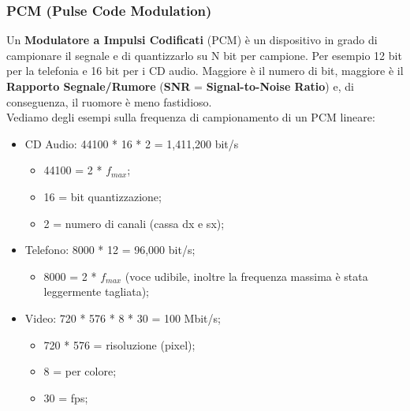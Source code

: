 \documentclass{article}
\begin{document}
			\subsubsection{PCM (Pulse Code Modulation)}
				Un \textbf{Modulatore a Impulsi Codificati} (PCM) è un dispositivo in grado di campionare il segnale e di quantizzarlo su N bit per campione. Per esempio 12 bit per la telefonia e 16 bit per i CD audio. Maggiore è il numero di bit, maggiore è il \textbf{Rapporto Segnale/Rumore} (\textbf{SNR} = \textbf{Signal-to-Noise Ratio})	e, di conseguenza, il ruomore è meno fastidioso.
				\\Vediamo degli esempi sulla frequenza di campionamento di un PCM lineare:
				\begin{itemize}
					\item CD Audio: 44100 * 16 * 2 = 1,411,200 bit/s
					\begin{itemize}
						\item 44100 = 2 * $f_{max}$;
						\item 16 = bit quantizzazione;
						\item 2 = numero di canali (cassa dx e sx);
					\end{itemize}
					\item Telefono: 8000 * 12 = 96,000 bit/s;
					\begin{itemize}
						\item 8000 = 2 * $f_{max}$ (voce udibile, inoltre la frequenza massima è stata leggermente tagliata);
					\end{itemize}
					\item Video: 720 * 576 * 8 * 30 = 100 Mbit/s;
					\begin{itemize}
						\item 720 * 576 = risoluzione (pixel);
						\item 8 = per colore;
						\item 30 = fps;
					\end{itemize}
				\end{itemize}
				
\end{document}
